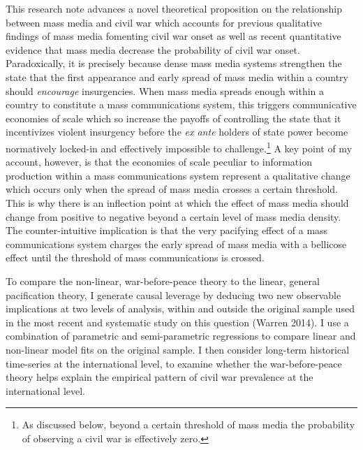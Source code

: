 \documentclass[11pt,article,oneside]{memoir}
\begin{document}
This research note advances a novel theoretical proposition on the
relationship between mass media and civil war which accounts for
previous qualitative findings of mass media fomenting civil war onset as
well as recent quantitative evidence that mass media decrease the
probability of civil war onset. Paradoxically, it is precisely because
dense mass media systems strengthen the state that the first appearance
and early spread of mass media within a country should \emph{encourage}
insurgencies. When mass media spreads enough within a country to
constitute a mass communications system, this triggers communicative
economies of scale which so increase the payoffs of controlling the
state that it incentivizes violent insurgency before the \emph{ex ante}
holders of state power become normatively locked-in and effectively
impossible to challenge.\footnote{As discussed below, beyond a certain
  threshold of mass media the probability of observing a civil war is
  effectively zero.} A key point of my account, however, is that the
economies of scale peculiar to information production within a mass
communications system represent a qualitative change which occurs only
when the spread of mass media crosses a certain threshold. This is why
there is an inflection point at which the effect of mass media should
change from positive to negative beyond a certain level of mass media
density. The counter-intuitive implication is that the very pacifying
effect of a mass communications system charges the early spread of mass
media with a bellicose effect until the threshold of mass communications
is crossed.

To compare the non-linear, war-before-peace theory to the linear,
general pacification theory, I generate causal leverage by deducing two
new observable implications at two levels of analysis, within and
outside the original sample used in the most recent and systematic study
on this question (Warren 2014). I use a combination of parametric and
semi-parametric regressions to compare linear and non-linear model fits
on the original sample. I then consider long-term historical time-series
at the international level, to examine whether the war-before-peace
theory helps explain the empirical pattern of civil war prevalence at
the international level.
\end{document}
